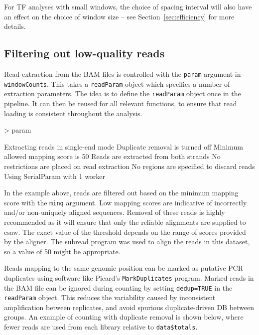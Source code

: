 \documentclass[12pt]{report}
\renewenvironment{Schunk}{\vspace{0pt}}{\vspace{0pt}}
\newcommand{\pkgname}{csaw}
\newcommand{\code}[1]{{\small\texttt{#1}}}
\newcommand{\subread}{subread}
\begin{document}
For TF analyses with small windows, the choice of spacing interval will also have an effect on the choice of window size -- see Section~\ref{sec:efficiency} for more details.

\subsection{Filtering out low-quality reads}
Read extraction from the BAM files is controlled with the \code{param} argument in \code{windowCounts}.
This takes a \code{readParam} object which specifies a number of extraction parameters.
The idea is to define the \code{readParam} object once in the pipeline.
It can then be reused for all relevant functions, to ensure that read loading is consistent throughout the analysis.

\begin{Schunk}
\begin{Sinput}
> param
\end{Sinput}
\begin{Soutput}
    Extracting reads in single-end mode
    Duplicate removal is turned off 
    Minimum allowed mapping score is 50 
    Reads are extracted from both strands
    No restrictions are placed on read extraction
    No regions are specified to discard reads
    Using SerialParam with 1 worker
\end{Soutput}
\end{Schunk}

In the example above, reads are filtered out based on the minimum mapping score with the \code{minq} argument. 
Low mapping scores are indicative of incorrectly and/or non-uniquely aligned sequences. 
Removal of these reads is highly recommended as it will ensure that only the reliable alignments are supplied to \pkgname{}.
The exact value of the threshold depends on the range of scores provided by the aligner. 
The \subread{} program \citep{liao2013} was used to align the reads in this dataset, so a value of 50 might be appropriate.

Reads mapping to the same genomic position can be marked as putative PCR duplicates using software like Picard's \code{MarkDuplicates} program.
Marked reads in the BAM file can be ignored during counting by setting \code{dedup=TRUE} in the \code{readParam} object. 
This reduces the variability caused by inconsistent amplification between replicates, and avoid spurious duplicate-driven DB between groups. 
An example of counting with duplicate removal is shown below, where fewer reads are used from each library relative to \code{data\$totals}.
\end{document}
